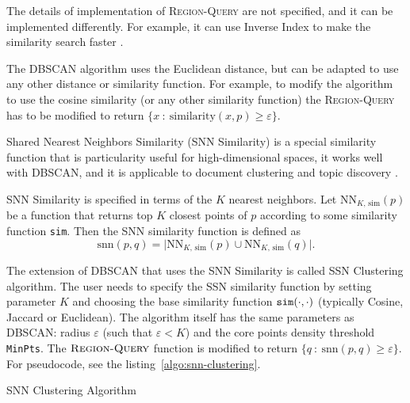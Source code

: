 The details of implementation of \textsc{Region-Query} are not specified,
and it can be implemented differently. For example, it can use
Inverse Index to make the similarity search faster
\cite{manning2008introduction} \cite{ertoz2003finding}.


The DBSCAN algorithm uses the Euclidean distance, but can be adapted to
use any other distance or similarity function. For example, to modify the
algorithm to use the cosine similarity (or any other similarity function)
the \textsc{Region-Query} has to be modified to return
$\{ x \ : \ \text{similarity}(x, p) \geqslant \varepsilon \}$.

Shared Nearest Neighbors Similarity (SNN Similarity) \cite{ertoz2003finding}
is a special similarity function that is particularity useful for
high-dimensional spaces, it works well with DBSCAN, and it is
applicable to document clustering and topic discovery \cite{ertoz2004finding}.

SNN Similarity is specified in terms of the $K$ nearest neighbors.
Let $\text{NN}_{K, \, \text{sim}}(p)$ be a function that returns
top $K$ closest points of $p$ according to some similarity function
\texttt{sim}. Then the SNN similarity function is  defined as
$$\text{snn}(p, q) = \big| \text{NN}_{K, \, \text{sim}}(p) \cup \text{NN}_{K, \, \text{sim}}(q) \big|.$$


The extension of DBSCAN that uses the SNN Similarity is called
SSN Clustering algorithm. The user needs to specify the SSN similarity
function by setting parameter $K$ and choosing the base similarity
function $\text{\texttt{sim}}(\cdot, \cdot)$ (typically Cosine, Jaccard
or Euclidean). The algorithm itself has the same
parameters as DBSCAN: radius $\varepsilon$ (such that $\varepsilon < K$)
and the core points density threshold \verb|MinPts|. The
$\textsc{Region-Query}$ function is modified to return
$\{ q \ : \ \text{snn}(p, q) \geqslant \varepsilon \}$. For pseudocode,
see the listing~\ref{algo:snn-clustering}.

\begin{algorithm} \caption{SNN Clustering Algorithm} \label{algo:snn-clustering}

\begin{algorithmic}[0]
  \Statex
     
    \EndFor

     
    \EndFor

    \State {}
  \EndFunction
\end{algorithmic}

\end{algorithm}


